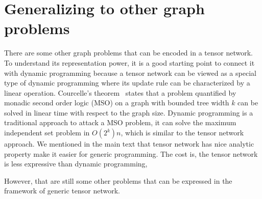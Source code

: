 \documentclass[review,onefignum,onetabnum]{siamart190516}
\newcommand{\<}{\langle}
\renewcommand{\>}{\rangle}
\newcommand{\Eq}[1]{Eq.~(\ref{#1})}
\newcounter{example}
\begin{document}
\section{Generalizing to other graph problems}\label{app:otherproblems}
There are some other graph problems that can be encoded in a tensor network.
To understand its representation power, it is a good starting point to connect it with dynamic programming because
a tensor network can be viewed as a special type of dynamic programming where its update rule can be characterized by a linear operation.
Courcelle’s theorem~\cite{Courcelle1990,Barr2020} states that a problem quantified by monadic second order logic (MSO) on a graph with bounded tree width $k$ can be solved in linear time with respect to the graph size.
Dynamic programming is a traditional approach to attack a MSO problem, it can solve the maximum independent set problem in $O(2^k)n$, which is similar to the tensor network approach.
We mentioned in the main text that tensor network has nice analytic property make it easier for generic programming.
The cost is, the tensor network is less expressive than dynamic programming,

However, that are still some other problems that can be expressed in the framework of generic tensor network.
\end{document}
